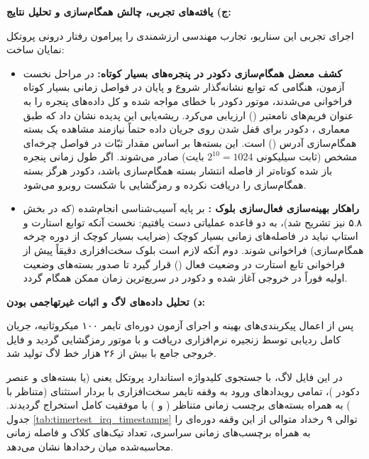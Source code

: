 \vspace{0.4cm}
\noindent
\textbf{ج) یافته‌های تجربی، چالش همگام‌سازی و تحلیل نتایج:}\par
اجرای تجربی این سناریو، تجارب مهندسی ارزشمندی را پیرامون رفتار درونی پروتکل  نمایان ساخت:
\begin{itemize}
    \item \textbf{کشف معضل همگام‌سازی دکودر در پنجره‌های بسیار کوتاه:} در مراحل نخست آزمون، هنگامی که توابع نشانه‌گذار شروع و پایان در فواصل زمانی بسیار کوتاه فراخوانی می‌شدند، موتور دکودر  با خطای  مواجه شده و کل داده‌های پنجره را به عنوان فریم‌های نامعتبر () ارزیابی می‌کرد. ریشه‌یابی این پدیده نشان داد که طبق معماری ، دکودر برای قفل شدن روی جریان داده حتماً نیازمند مشاهده یک بسته همگام‌سازی آدرس () است. این بسته‌ها بر اساس مقدار ثبّات  در فواصل چرخه‌ای مشخص (ثابت سیلیکونی $2^{10} = 1024$ بایت) صادر می‌شوند. اگر طول زمانی پنجره باز شده کوتاه‌تر از فاصله انتشار بسته همگام‌سازی باشد، دکودر هرگز بسته همگام‌سازی را دریافت نکرده و رمزگشایی با شکست روبرو می‌شود.
    \item \textbf{راهکار بهینه‌سازی فعال‌سازی بلوک :} بر پایه آسیب‌شناسی انجام‌شده (که در بخش ۵.۸ نیز تشریح شد)، به دو قاعده عملیاتی دست یافتیم: نخست آنکه توابع استارت و استاپ نباید در فاصله‌های زمانی بسیار کوچک (ضرایب بسیار کوچک از دوره چرخه همگام‌سازی) فراخوانی شوند. دوم آنکه لازم است بلوک سخت‌افزاری  دقیقاً پیش از فراخوانی تابع استارت در وضعیت فعال () قرار گیرد تا صدور بسته‌های وضعیت اولیه فوراً در خروجی آغاز شده و دکودر در سریع‌ترین زمان ممکن همگام گردد.
\end{itemize}

\vspace{0.4cm}
\noindent
\textbf{د) تحلیل داده‌های لاگ  و اثبات غیرتهاجمی بودن:}\par
پس از اعمال پیکربندی‌های بهینه و اجرای آزمون دوره‌ای تایمر ۱۰۰ میکروثانیه، جریان کامل ردیابی توسط زنجیره نرم‌افزاری دریافت و با موتور  رمزگشایی گردید و فایل خروجی جامع  با بیش از ۲۶ هزار خط لاگ تولید شد.

در این فایل لاگ، با جستجوی کلیدواژه استاندارد پروتکل یعنی  (یا بسته‌های  و عنصر دکودر )، تمامی رویدادهای ورود به وقفه تایمر سخت‌افزاری با بردار استثنای  (متناظر با ) به همراه بسته‌های برچسب زمانی متناظر ( و ) با موفقیت کامل استخراج گردیدند. جدول \ref{tab:timertest_irq_timestamps} توالی ۹ رخداد متوالی از این وقفه دوره‌ای را به همراه برچسب‌های زمانی سراسری، تعداد تیک‌های کلاک و فاصله زمانی محاسبه‌شده میان رخدادها نشان می‌دهد.

